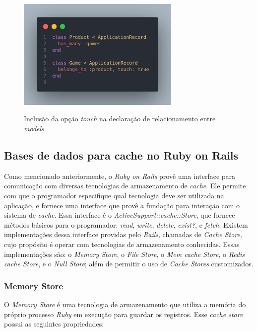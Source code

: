 \begin{figure}
    \centering
    \caption{Inclusão da opção \textit{touch} na declaração de relacionamento entre \textit{models}}
    \includegraphics[width=0.7\textwidth]{figuras/russian_doll_touch_true.png}
    \label{fig:russian_doll_touch_true}
\end{figure}

\subsection{Bases de dados para cache no Ruby on Rails}
\label{sec:bases_de_dados_para_cache_no_ruby_on_rails}

Como mencionado anteriormente, o \textit{Ruby on Rails} provê uma interface para comunicação com diversas tecnologias de armazenamento de \textit{cache}. Ele permite com que o programador especifique qual tecnologia deve ser utilizada na aplicação, e fornece uma interface que provê a fundação para interação com o sistema de \textit{cache}. Essa interface é o \textit{ActiveSupport::cache::Store}, que fornece métodos básicos para o programador: \textit{read}, \textit{write}, \textit{delete}, \textit{exist?}, e \textit{fetch}. Existem implementações dessa interface providas pelo \textit{Rails}, chamadas de \textit{Cache Store}, cujo propósito é operar com tecnologias de armazenamento conhecidas. Essas implementações são: o \textit{Memory Store}, o \textit{File Store}, o \textit{Mem \textit{cache} Store}, o \textit{Redis cache Store}, e o \textit{Null Store}; além de permitir o uso de \textit{Cache Stores} customizados.

\subsubsection{Memory Store}

O \textit{Memory Store} é uma tecnologia de armazenamento que utiliza a memória do próprio processo \textit{Ruby} em execução para guardar os registros. Esse \textit{cache store} possui as seguintes propriedades:

